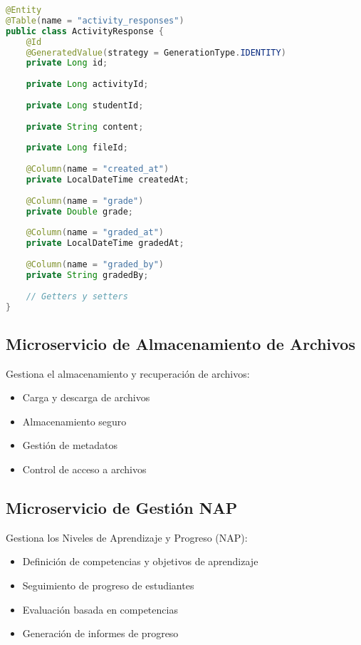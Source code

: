 \documentclass[12pt,a4paper]{report}
\begin{document}
\begin{lstlisting}[language=Java, caption=Modelo de ActivityResponse]
@Entity
@Table(name = "activity_responses")
public class ActivityResponse {
    @Id
    @GeneratedValue(strategy = GenerationType.IDENTITY)
    private Long id;
    
    private Long activityId;
    
    private Long studentId;
    
    private String content;
    
    private Long fileId;
    
    @Column(name = "created_at")
    private LocalDateTime createdAt;
    
    @Column(name = "grade")
    private Double grade;
    
    @Column(name = "graded_at")
    private LocalDateTime gradedAt;
    
    @Column(name = "graded_by")
    private String gradedBy;
    
    // Getters y setters
}
\end{lstlisting}

\subsection{Microservicio de Almacenamiento de Archivos}
Gestiona el almacenamiento y recuperación de archivos:

\begin{itemize}
    \item Carga y descarga de archivos
    \item Almacenamiento seguro
    \item Gestión de metadatos
    \item Control de acceso a archivos
\end{itemize}

\subsection{Microservicio de Gestión NAP}
Gestiona los Niveles de Aprendizaje y Progreso (NAP):

\begin{itemize}
    \item Definición de competencias y objetivos de aprendizaje
    \item Seguimiento de progreso de estudiantes
    \item Evaluación basada en competencias
    \item Generación de informes de progreso
\end{itemize}
\end{document}
